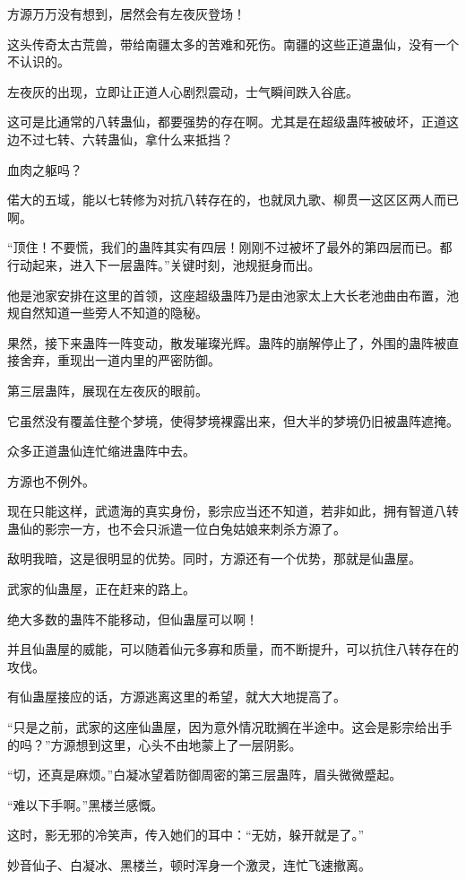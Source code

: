\begin{this_body}
方源万万没有想到，居然会有左夜灰登场！

这头传奇太古荒兽，带给南疆太多的苦难和死伤。南疆的这些正道蛊仙，没有一个不认识的。

左夜灰的出现，立即让正道人心剧烈震动，士气瞬间跌入谷底。

这可是比通常的八转蛊仙，都要强势的存在啊。尤其是在超级蛊阵被破坏，正道这边不过七转、六转蛊仙，拿什么来抵挡？

血肉之躯吗？

偌大的五域，能以七转修为对抗八转存在的，也就凤九歌、柳贯一这区区两人而已啊。

“顶住！不要慌，我们的蛊阵其实有四层！刚刚不过被坏了最外的第四层而已。都行动起来，进入下一层蛊阵。”关键时刻，池规挺身而出。

他是池家安排在这里的首领，这座超级蛊阵乃是由池家太上大长老池曲由布置，池规自然知道一些旁人不知道的隐秘。

果然，接下来蛊阵一阵变动，散发璀璨光辉。蛊阵的崩解停止了，外围的蛊阵被直接舍弃，重现出一道内里的严密防御。

第三层蛊阵，展现在左夜灰的眼前。

它虽然没有覆盖住整个梦境，使得梦境裸露出来，但大半的梦境仍旧被蛊阵遮掩。

众多正道蛊仙连忙缩进蛊阵中去。

方源也不例外。

现在只能这样，武遗海的真实身份，影宗应当还不知道，若非如此，拥有智道八转蛊仙的影宗一方，也不会只派遣一位白兔姑娘来刺杀方源了。

敌明我暗，这是很明显的优势。同时，方源还有一个优势，那就是仙蛊屋。

武家的仙蛊屋，正在赶来的路上。

绝大多数的蛊阵不能移动，但仙蛊屋可以啊！

并且仙蛊屋的威能，可以随着仙元多寡和质量，而不断提升，可以抗住八转存在的攻伐。

有仙蛊屋接应的话，方源逃离这里的希望，就大大地提高了。

“只是之前，武家的这座仙蛊屋，因为意外情况耽搁在半途中。这会是影宗给出手的吗？”方源想到这里，心头不由地蒙上了一层阴影。

“切，还真是麻烦。”白凝冰望着防御周密的第三层蛊阵，眉头微微蹙起。

“难以下手啊。”黑楼兰感慨。

这时，影无邪的冷笑声，传入她们的耳中：“无妨，躲开就是了。”

妙音仙子、白凝冰、黑楼兰，顿时浑身一个激灵，连忙飞速撤离。


\end{this_body}
